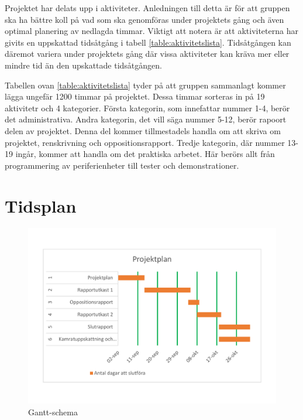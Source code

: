 \documentclass[a4paper]{article}
\begin{document}
Projektet har delats upp i aktiviteter. Anledningen till detta är för att gruppen ska ha bättre koll på vad som ska genomföras under projektets gång och även optimal planering av nedlagda timmar. Viktigt att notera är att aktiviteterna har givits en uppskattad tidsåtgång i tabell \ref{table:aktivitetslista}. Tidsåtgången kan däremot variera under projektets gång där vissa aktiviteter kan kräva mer eller mindre tid än den upskattade tidsåtgången.


Tabellen ovan \ref{table:aktivitetslista} tyder på att gruppen sammanlagt kommer lägga ungefär 1200 timmar på projektet. Dessa timmar sorteras in på 19 aktivitetr och 4 kategorier. Första kategorin, som innefattar nummer 1-4, berör det administrativa. Andra kategorin, det vill säga nummer 5-12, berör rapoort delen av projektet. Denna del kommer tillmestadels handla om att skriva om projektet, renskrivning och oppositionsrapport. Tredje kategorin, där nummer 13-19 ingår, kommer att handla om det praktiska arbetet. Här berörs allt från programmering av periferienheter till tester och demonstrationer. 


\section{Tidsplan}
\begin{figure}[H]
    \includegraphics[width=\textwidth]{Gantschema.pdf}
    \caption{Gantt-schema}
    \label{figure:gantt}
\end{figure}
\end{document}
